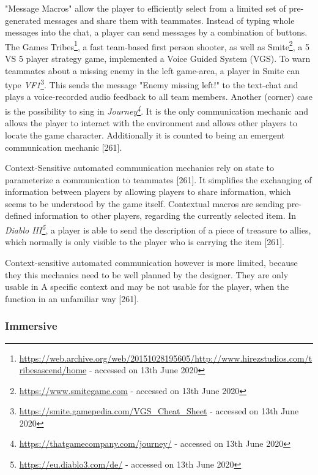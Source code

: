 "Message Macros" allow the player to efficiently select from a limited set of pre-generated messages and share them with teammates. Instead of typing whole messages into the chat, a player can send messages by a combination of buttons.
The Games Tribes\footnote{\url{https://web.archive.org/web/20151028195605/http://www.hirezstudios.com/tribesascend/home} - accessed on 13th June 2020}, a fast team-based first person shooter, as well as Smite\footnote{\url{https://www.smitegame.com} - accessed on 13th June 2020}, a 5 VS 5 player strategy game, implemented a Voice Guided System (VGS). To warn teammates about a missing enemy in the left game-area, a player in Smite can type \textit{VF1}\footnote{\url{https://smite.gamepedia.com/VGS_Cheat_Sheet} - accessed on 13th June 2020}. This sends the message "Enemy missing left!" to the text-chat and plays a voice-recorded audio feedback to all team members.
Another (corner) case is the possibility to sing in \textit{Journey\footnote{\url{https://thatgamecompany.com/journey/} - accessed on 13th June 2020}}. It is the only communication mechanic and allows the player to interact with the environment and allows other players to locate the game character. Additionally it is counted to being an emergent communication mechanic \autocite{Toups2014ATheory}[261].


Context-Sensitive automated communication mechanics rely on state to parameterize a communication to teammates \autocite{Toups2014ATheory}[261]. It simplifies the exchanging of information between players by allowing players to share information, which seems to be understood by the game itself.
Contextual macros are sending pre-defined information to other players, regarding the currently selected item. In \textit{Diablo III\footnote{\url{https://eu.diablo3.com/de/} - accessed on 13th June 2020}}, a player is able to send the description of a piece of treasure to allies, which normally is only visible to the player who is carrying the item \autocite{Toups2014ATheory}[261].

Context-sensitive automated communication however is more limited, because they this mechanics need to be well planned by the designer. They are only usable in A specific context and may be not usable for the player, when the function in an unfamiliar way \autocite{Toups2014ATheory}[261]. 


\subsubsection{Immersive}
\label{section:Immersive}

